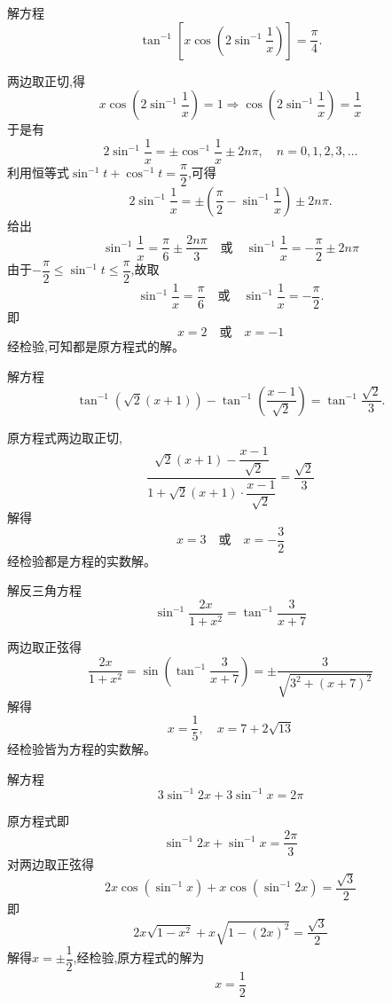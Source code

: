 \begin{questions}
    \question 解方程
    \[
    \tan^{-1}\!\left[x\cos\!\left(2\sin^{-1}\frac{1}{x}\right)\right]=\frac{\pi}{4}.
    \]
    \begin{solution}
        两边取正切,得
        \[
        x\cos\left(2\sin^{-1}\frac{1}{x}\right)=1 \Rightarrow
        \cos\left(2\sin^{-1}\frac{1}{x}\right)=\frac{1}{x}
        \]
        于是有
        \[
        2\sin^{-1}\frac{1}{x}=\pm\cos^{-1}\frac{1}{x}\pm 2n\pi,\quad n=0,1,2,3,\dots
        \]
        利用恒等式$\sin^{-1}t+\cos^{-1}t=\dfrac{\pi}{2}$,可得
        \[
        2\sin^{-1}\frac{1}{x}
        =\pm\left(\frac{\pi}{2}-\sin^{-1}\frac{1}{x}\right)\pm 2n\pi.
        \]
        给出
        \[
        \sin^{-1}\frac{1}{x}=\frac{\pi}{6}\pm\frac{2n\pi}{3}
        \quad \text{或} \quad
        \sin^{-1}\frac{1}{x}=-\frac{\pi}{2}\pm 2n\pi
        \]
        由于$-\dfrac{\pi}{2}\leq \sin^{-1}t\leq \dfrac{\pi}{2}$,故取
        \[
        \sin^{-1}\frac{1}{x}=\frac{\pi}{6}\quad\text{或}\quad
        \sin^{-1}\frac{1}{x}=-\frac{\pi}{2}.
        \]
        即
        \[
        x=2 \quad \text{或} \quad x=-1
        \]
        经检验,可知都是原方程式的解。
    \end{solution}

    \question 解方程
    \[
    \tan^{-1}\left(\sqrt{2}(x+1)\right)-\tan^{-1}\left(\frac{x-1}{\sqrt{2}}\right)=\tan^{-1}\!\frac{\sqrt{2}}{3}.
    \]
    \begin{solution}
        原方程式两边取正切,
        \[
        \frac{\sqrt{2}(x+1)-\dfrac{x-1}{\sqrt{2}}}{1+\sqrt{2}(x+1)\cdot\dfrac{x-1}{\sqrt{2}}}=\frac{\sqrt{2}}{3}
        \]
        解得
        \[
        x=3\quad\text{或}\quad x=-\frac{3}{2}
        \]
        经检验都是方程的实数解。
    \end{solution}

    \question 解反三角方程
    \[
    \sin^{-1}\frac{2x}{1+x^2}=\tan^{-1}\frac{3}{x+7}
    \]
    \begin{solution}
        两边取正弦得
        \[
        \frac{2x}{1+x^2}=\sin\left(\tan^{-1}\frac{3}{x+7}\right)=\pm \frac{3}{\sqrt{3^2+(x+7)^2}}
        \]
        解得
        \[
        x=\frac{1}{5},\quad x=7+2\sqrt{13}
        \]
        经检验皆为方程的实数解。
    \end{solution}

    \question 解方程
    \[
    3\sin^{-1}2x+3\sin^{-1}x = 2\pi
    \]
    \begin{solution}
        原方程式即
        \[
        \sin^{-1}2x+\sin^{-1}x = \frac{2\pi}{3}
        \]
        对两边取正弦得
        \[
        2x\cos(\sin^{-1}x)+x\cos(\sin^{-1}2x) = \frac{\sqrt{3}}{2}
        \]
        即
        \[
        2x\sqrt{1-x^2}+x\sqrt{1-(2x)^2}=\frac{\sqrt{3}}{2}
        \]
        解得$x=\pm \dfrac{1}{2}$,经检验,原方程式的解为
        \[
        x=\frac{1}{2}
        \]
    \end{solution}


\end{questions}
